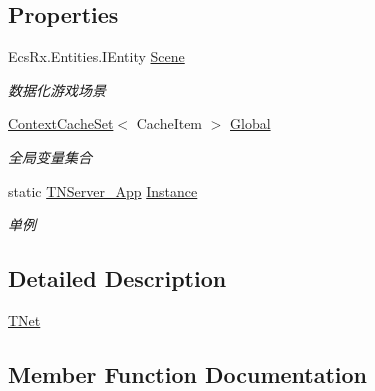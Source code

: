 \subsection*{Properties}
\begin{DoxyCompactItemize}
\item 
Ecs\+Rx.\+Entities.\+I\+Entity \mbox{\hyperlink{class_t_net_1_1_runtime_1_1_t_n_server___app_a4260139e06b19b806ba842317ca767e9}{Scene}}
\begin{DoxyCompactList}\small\item\em 数据化游戏场景 \end{DoxyCompactList}\item 
\mbox{\hyperlink{class_t_net_1_1_cache_1_1_context_cache_set}{Context\+Cache\+Set}}$<$ Cache\+Item $>$ \mbox{\hyperlink{class_t_net_1_1_runtime_1_1_t_n_server___app_ac6b55629b934b4e962a3aa3dc502246c}{Global}}
\begin{DoxyCompactList}\small\item\em 全局变量集合 \end{DoxyCompactList}\item 
static \mbox{\hyperlink{class_t_net_1_1_runtime_1_1_t_n_server___app}{T\+N\+Server\+\_\+\+App}} \mbox{\hyperlink{class_t_net_1_1_runtime_1_1_t_n_server___app_a15b505a48cd0a73cdf7a8a78a05353c2}{Instance}}
\begin{DoxyCompactList}\small\item\em 单例 \end{DoxyCompactList}\end{DoxyCompactItemize}


\subsection{Detailed Description}
\mbox{\hyperlink{namespace_t_net}{T\+Net}} 



\subsection{Member Function Documentation}
\mbox{\label{class_t_net_1_1_runtime_1_1_t_n_server___app_a0fbd0d2d3bc734612f9cf92cd51ad116}} 
